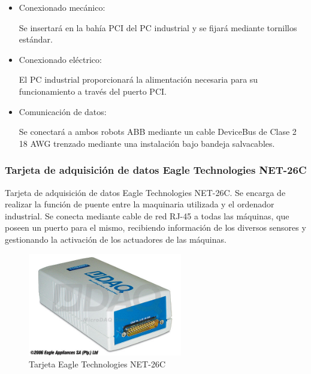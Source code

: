 		\begin{itemize}
				\item{Conexionado mecánico:}
				
				Se insertará en la bahía PCI del PC industrial y se fijará mediante tornillos estándar.

				\item{Conexionado eléctrico:}

				El PC industrial proporcionará la alimentación necesaria para su funcionamiento a través del puerto PCI.
 				
				\item{Comunicación de datos:}
				
				Se conectará a ambos robots ABB mediante un cable DeviceBus de Clase 2 18 AWG trenzado mediante una instalación bajo bandeja salvacables.

		\end{itemize}

\newpage


	\subsubsection{Tarjeta de adquisición de datos Eagle Technologies NET-26C}

	
		Tarjeta de adquisición de datos Eagle Technologies NET-26C. Se encarga de realizar la función de puente entre la maquinaria utilizada y el ordenador industrial. Se conecta mediante cable de red RJ-45 a todas las máquinas, que poseen un puerto para el mismo, recibiendo información de los diversos sensores y gestionando la activación de los actuadores de las máquinas.\\

		\begin{figure}[htp]
			\centering
			\includegraphics[width=0.6\textwidth]{Datasheets/10Foto.jpg}
			\caption{Tarjeta Eagle Technologies NET-26C}
			\label{fig:testa}
	\end{figure}



